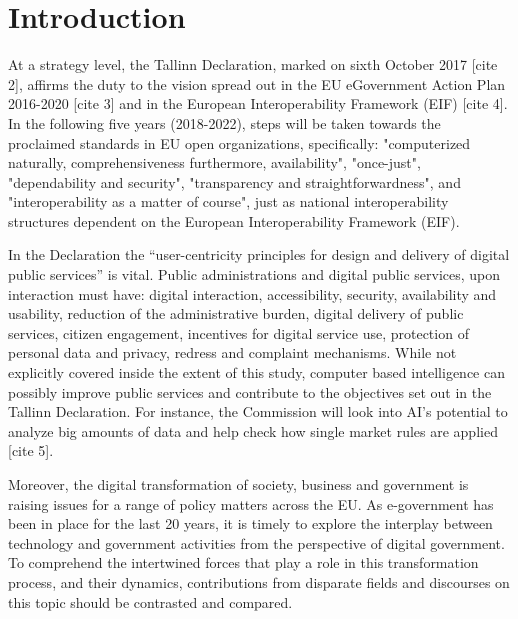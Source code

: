 
\chapter{Introduction}  %

\ifpdf
    \graphicspath{{Chapter1/Figs/Raster/}{Chapter1/Figs/PDF/}{Chapter1/Figs/}}
\else
    \graphicspath{{Chapter1/Figs/Vector/}{Chapter1/Figs/}}
\fi

At a strategy level, the Tallinn Declaration, marked on sixth October 2017
[cite 2], affirms the duty to the vision spread out in the EU eGovernment
Action Plan 2016-2020 [cite 3] and in the European Interoperability Framework (EIF)
[cite 4]. In the following five years (2018-2022), steps will be taken towards
the proclaimed standards in EU open organizations, specifically: "computerized
naturally, comprehensiveness furthermore, availability", "once-just", "dependability
and security", "transparency and straightforwardness", and "interoperability as a
matter of course", just as national interoperability structures dependent on the
European Interoperability Framework (EIF).

In the Declaration the “user-centricity principles for design and delivery of
digital public services” is vital. Public administrations and digital public services,
upon interaction must have: digital interaction, accessibility, security, availability
and usability, reduction of the administrative burden, digital delivery of public services,
citizen engagement, incentives for digital service use, protection of personal data and
privacy, redress and complaint mechanisms. While not explicitly covered inside the extent
of this study, computer based intelligence can possibly improve public services and contribute
to the objectives set out in the Tallinn Declaration. For instance, the Commission will look
into AI's potential to analyze big amounts of data and help check how single market
rules are applied [cite 5].

Moreover, the digital transformation of society, business and government is raising
issues for a range of policy matters across the EU. As e-government has
been in place for the last 20 years, it is timely to explore the interplay between
technology and government activities from the perspective of digital government.
To comprehend the intertwined forces that play a role in this transformation process,
and their dynamics, contributions from disparate fields and discourses on this topic
should be contrasted and compared.

